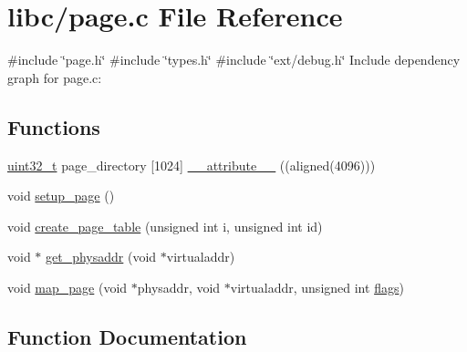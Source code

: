 \hypertarget{a00074}{}\section{libc/page.c File Reference}
\label{a00074}
{\ttfamily \#include \char`\"{}page.\+h\char`\"{}}\newline
{\ttfamily \#include \char`\"{}types.\+h\char`\"{}}\newline
{\ttfamily \#include \char`\"{}ext/debug.\+h\char`\"{}}\newline
Include dependency graph for page.\+c\+:
\subsection*{Functions}
\begin{DoxyCompactItemize}
\item 
\hyperlink{a00092_a435d1572bf3f880d55459d9805097f62_a435d1572bf3f880d55459d9805097f62}{uint32\+\_\+t} page\+\_\+directory \mbox{[}1024\mbox{]} \hyperlink{a00074_a37f8e955bf961194d85eb31c4083e0ba_a37f8e955bf961194d85eb31c4083e0ba}{\+\_\+\+\_\+attribute\+\_\+\+\_\+} ((aligned(4096)))
\item 
void \hyperlink{a00074_a51f6a37816540dea572d38f2713e9f5a_a51f6a37816540dea572d38f2713e9f5a}{setup\+\_\+page} ()
\item 
void \hyperlink{a00074_a7bb2c9b4c69002e17903710ce4de395c_a7bb2c9b4c69002e17903710ce4de395c}{create\+\_\+page\+\_\+table} (unsigned int i, unsigned int id)
\item 
void $\ast$ \hyperlink{a00074_ae584a02a60a268b787ee275aee930051_ae584a02a60a268b787ee275aee930051}{get\+\_\+physaddr} (void $\ast$virtualaddr)
\item 
void \hyperlink{a00074_adf8c9211327b122b455fabf292cc2411_adf8c9211327b122b455fabf292cc2411}{map\+\_\+page} (void $\ast$physaddr, void $\ast$virtualaddr, unsigned int \hyperlink{a00065_aa2585d779da0ab21273a8d92de9a0ebe_aa2585d779da0ab21273a8d92de9a0ebe}{flags})
\end{DoxyCompactItemize}


\subsection{Function Documentation}
\mbox{\label{a00074_a37f8e955bf961194d85eb31c4083e0ba_a37f8e955bf961194d85eb31c4083e0ba}} 
